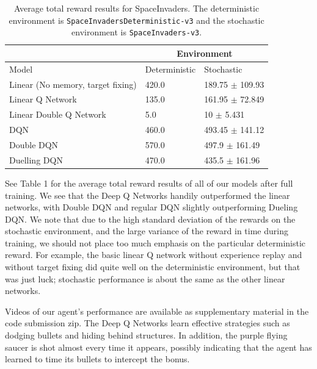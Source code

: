 \documentclass[letterpaper]{article}
\begin{document}
\begin{table}[!ht]
\centering
\label{results}
\begin{tabular}{|l|l|l|}
\hline
                                  & \multicolumn{2}{c|}{Environment} \\ \hline
Model                       & Deterministic & Stochastic \\ \hline
Linear (No memory, target fixing) &  420.0             &  189.75 $\pm$ 109.93          \\ \hline
Linear Q Network                  &  135.0             &  161.95 $\pm$ 72.849          \\ \hline
Linear Double Q Network           &  5.0             &  10 $\pm$ 5.431         \\ \hline
DQN                               &  460.0             & 493.45 $\pm$ 141.12     \\ \hline
Double DQN                        &  570.0            &  497.9 $\pm$ 161.49          \\ \hline
Duelling DQN                      &  470.0             & 435.5 $\pm$ 161.96  \\ \hline
\end{tabular}

\caption{Average total reward results for SpaceInvaders. The deterministic environment is \texttt{SpaceInvadersDeterministic-v3} and the stochastic environment is \texttt{SpaceInvaders-v3}.}
\end{table}
See Table 1 for the average total reward results of all of our models after full training. We see that the Deep Q Networks handily outperformed the linear networks, with Double DQN and regular DQN slightly outperforming Dueling DQN. We note that due to the high standard deviation of the rewards on the stochastic environment, and the large variance of the reward in time during training, we should not place too much emphasis on the particular deterministic reward. For example, the basic linear Q network without experience replay and without target fixing did quite well on the deterministic environment, but that was just luck; stochastic performance is about the same as the other linear networks.

Videos of our agent's performance are available as supplementary material in the code submission zip. The Deep Q Networks learn effective strategies such as dodging bullets and hiding behind structures. In addition, the purple flying saucer is shot almost every time it appears, possibly indicating that the agent has learned to time its bullets to intercept the bonus.
\end{document}
